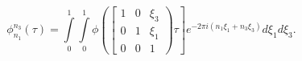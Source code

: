 \begin{equation}
\phi^{n_{3}}_{n_{1}}(\tau ) = \int\limits^1_0 \int\limits^1_0
\phi\left(
\left[
\begin{array}{ccc} 
1 & 0 & \xi_3\\ 0 & 1 & \xi_1 \\ 0 & 0 & 1
\end{array}
\right)
\tau\right] e^{-2\pi i(n_{1}\xi_{1}+n_{3}\xi_{3})} d\xi_1
d\xi_3.
\end{equation}

